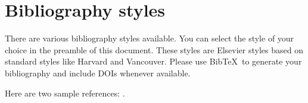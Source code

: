 \section{Bibliography styles}

  There are various bibliography styles available. You can select the style of your choice in the preamble of this document. These styles are Elsevier styles based on standard styles like Harvard and Vancouver. Please use Bib\TeX\ to generate your bibliography and include DOIs whenever available.
  
  Here are two sample references: \cite{Feynman1963118,Dirac1953888}.

